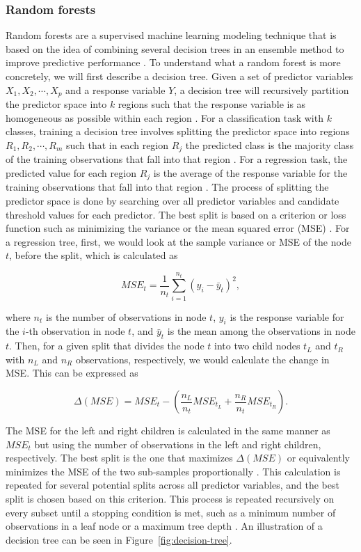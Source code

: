 \subsubsection{Random forests}
Random forests are a supervised machine learning modeling technique that is based on the idea of combining several decision trees in an ensemble method to improve predictive performance \parencite{breiman2001}. To understand what a random forest is more concretely, we will first describe a decision tree. Given a set of predictor variables \(X_1, X_2, \cdots, X_p\) and a response variable \(Y\), a decision tree will recursively partition the predictor space into \(k\) regions such that the response variable is as homogeneous as possible within each region \parencite{loh_classification_2011}. For a classification task with \(k\) classes, training a decision tree involves splitting the predictor space into regions \(R_1, R_2, \cdots, R_m\) such that in each region \(R_j\) the predicted class is the majority class of the training observations that fall into that region \parencite{moisen_classification_2008, loh_classification_2011}. For a regression task, the predicted value for each region \(R_j\) is the average of the response variable for the training observations that fall into that region \parencite{moisen_classification_2008, loh_classification_2011}. The process of splitting the predictor space is done by searching over all predictor variables and candidate threshold values for each predictor. The best split is based on a criterion or loss function such as minimizing the variance or the mean squared error (MSE) \parencite{klusowski_analyzing_2020}. For a regression tree, first, we would look at the sample variance or MSE of the node \(t\), before the split, which is calculated as

\[MSE_t = \frac{1}{n_t}\sum_{i=1}^{n_t}(y_i - \bar{y}_t)^2,\]

where \(n_t\) is the number of observations in node \(t\), \(y_i\) is the response variable for the \(i\)-th observation in node \(t\), and \(\bar{y}_t\) is the mean among the observations in node \(t\). Then, for a given split that divides the node \(t\) into two child nodes \(t_L\) and \(t_R\) with \(n_L\) and \(n_R\) observations, respectively, we would calculate the change in MSE. This can be expressed as

\[ \Delta (MSE) = MSE_t - (\frac{n_L}{n_t} MSE_{t_L} + \frac{n_R}{n_t} MSE_{t_R}).\]

The MSE for the left and right children is calculated in the same manner as \(MSE_t\) but using the number of observations in the left and right children, respectively. The best split is the one that maximizes \(\Delta (MSE)\) or equivalently minimizes the MSE of the two sub-samples proportionally \parencite{klusowski_analyzing_2020}. This calculation is repeated for several potential splits across all predictor variables, and the best split is chosen based on this criterion. This process is repeated recursively on every subset until a stopping condition is met, such as a minimum number of observations in a leaf node or a maximum tree depth \parencite{mienye_survey_2024}. An illustration of a decision tree can be seen in Figure~\ref{fig:decision-tree}.

